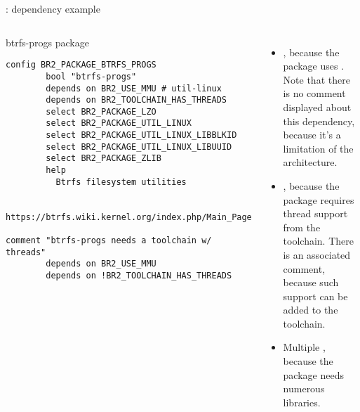 \begin{frame}[fragile]{: dependency example}

  \begin{columns}
    \begin{block}{btrfs-progs package}
      \tiny
\begin{verbatim}
config BR2_PACKAGE_BTRFS_PROGS
        bool "btrfs-progs"
        depends on BR2_USE_MMU # util-linux
        depends on BR2_TOOLCHAIN_HAS_THREADS
        select BR2_PACKAGE_LZO
        select BR2_PACKAGE_UTIL_LINUX
        select BR2_PACKAGE_UTIL_LINUX_LIBBLKID
        select BR2_PACKAGE_UTIL_LINUX_LIBUUID
        select BR2_PACKAGE_ZLIB
        help
          Btrfs filesystem utilities

          https://btrfs.wiki.kernel.org/index.php/Main_Page

comment "btrfs-progs needs a toolchain w/ threads"
        depends on BR2_USE_MMU
        depends on !BR2_TOOLCHAIN_HAS_THREADS
\end{verbatim}
  \end{block}
    {\scriptsize
    \begin{itemize}
    \item {}, because the package uses
      . Note that there is no comment displayed about this
      dependency, because it's a limitation of the architecture.
    \item {}, because the
      package requires thread support from the toolchain. There is an
      associated comment, because such support can be added to the
      toolchain.
    \item Multiple , because the package
      needs numerous libraries.
    \end{itemize}}
  \end{columns}
\end{frame}

